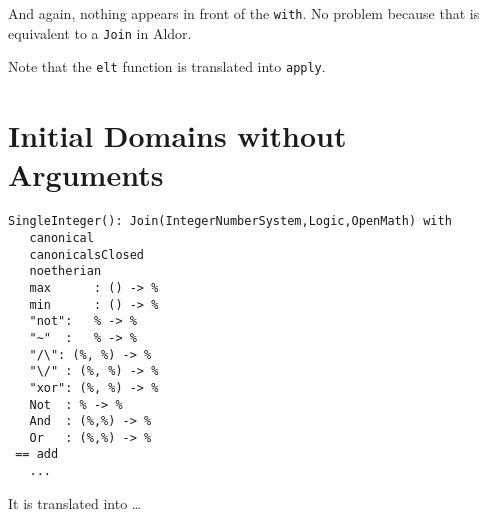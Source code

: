 \documentclass{article}
\begin{document}
And again, nothing appears in front of the \verb'with'. No problem
because that is equivalent to a \verb'Join' in Aldor.

Note that the \verb'elt' function is translated into \verb'apply'.



















\section{Initial Domains without Arguments}
\label{sec:InitDomain}
\begin{verbatim}
SingleInteger(): Join(IntegerNumberSystem,Logic,OpenMath) with
   canonical
   canonicalsClosed
   noetherian
   max      : () -> %
   min      : () -> %
   "not":   % -> %
   "~"  :   % -> %
   "/\": (%, %) -> %
   "\/" : (%, %) -> %
   "xor": (%, %) -> %
   Not  : % -> %
   And  : (%,%) -> %
   Or   : (%,%) -> %
 == add
   ...
\end{verbatim}
It is translated into \ldots
\end{document}
